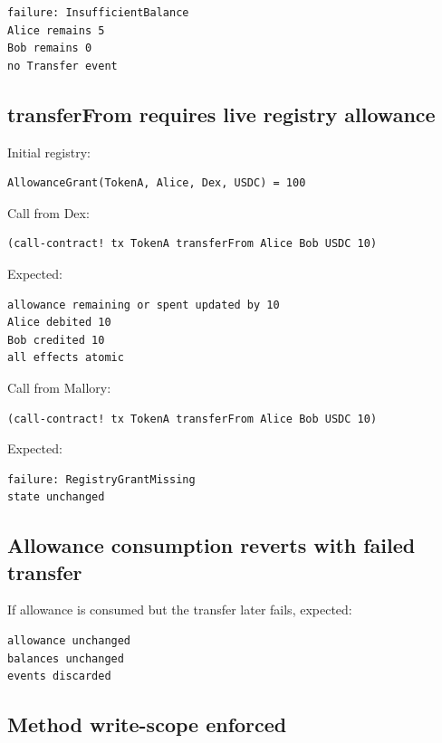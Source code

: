 \documentclass[11pt]{article}
\begin{document}
\begin{lstlisting}
failure: InsufficientBalance
Alice remains 5
Bob remains 0
no Transfer event
\end{lstlisting}

\subsection{transferFrom requires live registry allowance}

Initial registry:

\begin{lstlisting}
AllowanceGrant(TokenA, Alice, Dex, USDC) = 100
\end{lstlisting}

Call from Dex:

\begin{lstlisting}
(call-contract! tx TokenA transferFrom Alice Bob USDC 10)
\end{lstlisting}

Expected:

\begin{lstlisting}
allowance remaining or spent updated by 10
Alice debited 10
Bob credited 10
all effects atomic
\end{lstlisting}

Call from Mallory:

\begin{lstlisting}
(call-contract! tx TokenA transferFrom Alice Bob USDC 10)
\end{lstlisting}

Expected:

\begin{lstlisting}
failure: RegistryGrantMissing
state unchanged
\end{lstlisting}

\subsection{Allowance consumption reverts with failed transfer}

If allowance is consumed but the transfer later fails, expected:

\begin{lstlisting}
allowance unchanged
balances unchanged
events discarded
\end{lstlisting}

\subsection{Method write-scope enforced}
\end{document}
